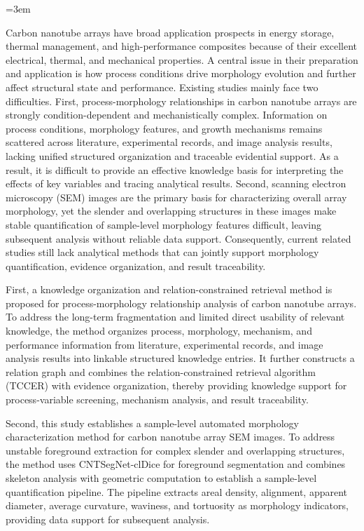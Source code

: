 \begin{enabstract}
\emergencystretch=3em

Carbon nanotube arrays have broad application prospects in energy storage, thermal management, and high-performance composites because of their excellent electrical, thermal, and mechanical properties. A central issue in their preparation and application is how process conditions drive morphology evolution and further affect structural state and performance. Existing studies mainly face two difficulties. First, process-morphology relationships in carbon nanotube arrays are strongly condition-dependent and mechanistically complex. Information on process conditions, morphology features, and growth mechanisms remains scattered across literature, experimental records, and image analysis results, lacking unified structured organization and traceable evidential support. As a result, it is difficult to provide an effective knowledge basis for interpreting the effects of key variables and tracing analytical results. Second, scanning electron microscopy (SEM) images are the primary basis for characterizing overall array morphology, yet the slender and overlapping structures in these images make stable quantification of sample-level morphology features difficult, leaving subsequent analysis without reliable data support. Consequently, current related studies still lack analytical methods that can jointly support morphology quantification, evidence organization, and result traceability.

First, a knowledge organization and relation-constrained retrieval method is proposed for process-morphology relationship analysis of carbon nanotube arrays. To address the long-term fragmentation and limited direct usability of relevant knowledge, the method organizes process, morphology, mechanism, and performance information from literature, experimental records, and image analysis results into linkable structured knowledge entries. It further constructs a relation graph and combines the relation-constrained retrieval algorithm (TCCER) with evidence organization, thereby providing knowledge support for process-variable screening, mechanism analysis, and result traceability.

Second, this study establishes a sample-level automated morphology characterization method for carbon nanotube array SEM images. To address unstable foreground extraction for complex slender and overlapping structures, the method uses CNTSegNet-clDice for foreground segmentation and combines skeleton analysis with geometric computation to establish a sample-level quantification pipeline. The pipeline extracts areal density, alignment, apparent diameter, average curvature, waviness, and tortuosity as morphology indicators, providing data support for subsequent analysis.


\end{enabstract}
